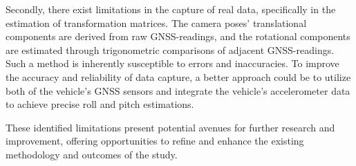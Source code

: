 Secondly, there exist limitations in the capture of real data, specifically in the estimation of transformation matrices. The camera poses' translational components are derived from raw GNSS-readings, and the rotational components are estimated through trigonometric comparisons of adjacent GNSS-readings. Such a method is inherently susceptible to errors and inaccuracies. To improve the accuracy and reliability of data capture, a better approach could be to utilize both of the vehicle's GNSS sensors and integrate the vehicle's accelerometer data to achieve precise roll and pitch estimations.

These identified limitations present potential avenues for further research and improvement, offering opportunities to refine and enhance the existing methodology and outcomes of the study.